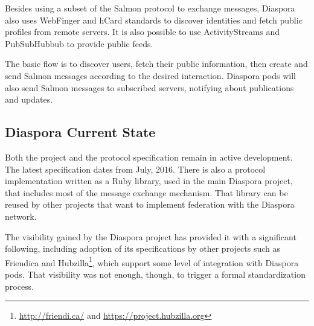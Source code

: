 Besides using a subset of the Salmon protocol to exchange messages,
Diaspora also uses WebFinger and hCard standards to discover identities
and fetch public profiles from remote servers. It is also possible to
use ActivityStreams and PubSubHubbub to provide public feeds.

The basic flow is to discover users, fetch their public information,
then create and send Salmon messages according to the desired
interaction. Diaspora pods will also send Salmon messages to subscribed
servers, notifying about publications and updates.

\subsection{Diaspora Current State}

Both the project and the protocol specification remain in active
development. The latest specification dates from July, 2016. There is
also a protocol implementation written as a Ruby library, used in the
main Diaspora project, that includes most of the message exchange
mechanism. That library can be reused by other projects that want to
implement federation with the Diaspora network.

The visibility gained by the Diaspora project has provided it with a
significant following, including adoption of its specifications by other
projects such as Friendica and Hubzilla\footnote{\url{http://friendi.ca/} and
\url{https://project.hubzilla.org}}, which support some level of
integration with Diaspora pods. That visibility was not enough, though,
to trigger a formal standardization process.
